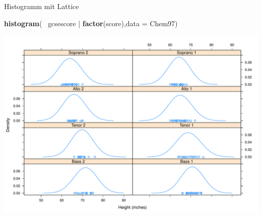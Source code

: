 \documentclass[ignorenonframetext,]{beamer}
\newenvironment{Shaded}{}{}
\newcommand{\KeywordTok}[1]{\textcolor[rgb]{0.00,0.44,0.13}{\textbf{{#1}}}}
\newcommand{\DataTypeTok}[1]{\textcolor[rgb]{0.56,0.13,0.00}{{#1}}}
\newcommand{\StringTok}[1]{\textcolor[rgb]{0.25,0.44,0.63}{{#1}}}
\newcommand{\NormalTok}[1]{{#1}}
\begin{document}
\begin{frame}[fragile]{Histogramm mit Lattice}

\begin{Shaded}
\begin{Highlighting}[]
  \KeywordTok{histogram}\NormalTok{(~}\StringTok{ }\NormalTok{gcsescore |}\StringTok{ }\KeywordTok{factor}\NormalTok{(score),}\DataTypeTok{data =} \NormalTok{Chem97)}
\end{Highlighting}
\end{Shaded}

\includegraphics{R_intern_files/figure-beamer/unnamed-chunk-226-1.pdf}

\end{frame}
\end{document}
